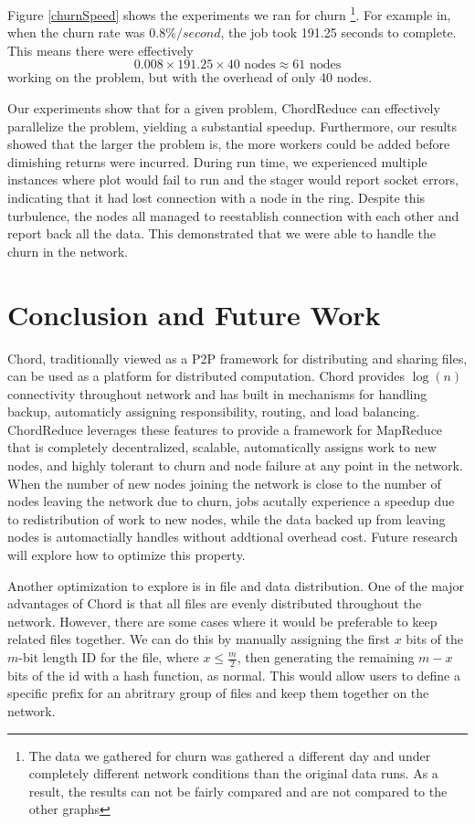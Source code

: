 \documentclass[10pt, conference, compsocconf]{IEEEtran}
\begin{document}
Figure \ref{churnSpeed} shows the experiments we ran for churn \footnote{The data we gathered for churn was gathered a different day and under completely different network conditions than the original data runs.  As a result, the results can not be fairly compared and are not compared to the other graphs}.   For example in, when the churn rate was $0.8\%/second$, the job took 191.25 seconds to complete.  This means there were effectively $$0.008 \times 191.25 \times 40 \text{ nodes} \approx 61 \text{ nodes} $$ working on the problem, but with the overhead of only 40 nodes. 


Our experiments show that for a given problem, ChordReduce can effectively parallelize the problem, yielding a substantial speedup.  Furthermore, our results showed that the larger the problem is, the more workers could be added before dimishing returns were incurred.  During run time, we experienced multiple instances where plot would fail to run and the stager would report socket errors, indicating that it had lost connection with a node in the ring.  Despite this turbulence, the nodes all managed to reestablish connection with each other and report back all the data.  This demonstrated that we were able to handle the churn in the network.



\section{Conclusion and Future Work}
Chord, traditionally viewed as a P2P framework for distributing and sharing files, can be used as a platform for distributed computation.  Chord provides $\log(n)$ connectivity throughout network and has built in mechanisms for handling backup, automaticly assigning responsibility, routing, and load balancing.  ChordReduce leverages these features to provide a framework for MapReduce that is completely decentralized, scalable, automatically assigns work to new nodes, and highly tolerant to churn and node failure at any point in the network.  When the number of new nodes joining the network is close to the number of nodes leaving the network due to churn, jobs acutally experience a speedup due to redistribution of work to new nodes, while the data backed up from leaving nodes is automactially handles without addtional overhead cost.  Future research will explore how to optimize this property. 
 
Another optimization to explore is in file and data distribution. One of the major advantages of Chord is that all files are evenly distributed throughout the network.  However, there are some cases where it would be preferable to keep related files together.  We can do this by manually assigning the first $x$ bits of the $m$-bit length ID for the file, where $x \leq \frac{m}{2}$, then generating the remaining $m-x$ bits of the id with a hash function, as normal.  This would allow users to define a specific prefix for an abritrary group of files and keep them together on the network.
\end{document}

